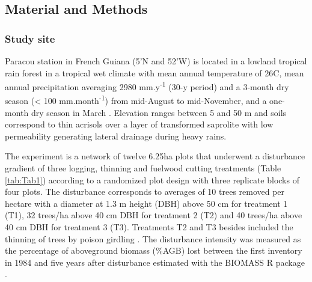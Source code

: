 \documentclass[
  11pt,
  french,
  A4paper,
  extrafontsizes,onecolumn,openright
  ]{memoir}
\begin{document}
\subsection{Material and Methods}\label{material-and-methods}

\subsubsection{Study site}\label{study-site}

Paracou station in French Guiana (5'N and
52'W) is located in a lowland tropical rain forest in a
tropical wet climate with mean annual temperature of 26\textdegree C,
mean annual precipitation averaging 2980 mm.y\textsuperscript{-1} (30-y
period) and a 3-month dry season (\textless{} 100
mm.month\textsuperscript{-1}) from mid-August to mid-November, and a
one-month dry season in March \autocite{Wagner2011}. Elevation ranges
between 5 and 50 m and soils correspond to thin acrisols over a layer of
transformed saprolite with low permeability generating lateral drainage
during heavy rains.

The experiment is a network of twelve 6.25ha plots that underwent a
disturbance gradient of three logging, thinning and fuelwood cutting
treatments (Table \ref{tab:Tab1}) according to a randomized plot design
with three replicate blocks of four plots. The disturbance corresponds
to averages of 10 trees removed per hectare with a diameter at 1.3 m
height (DBH) above 50 cm for treatment 1 (T1), 32 trees/ha above 40 cm
DBH for treatment 2 (T2) and 40 trees/ha above 40 cm DBH for treatment 3
(T3). Treatments T2 and T3 besides included the thinning of trees by
poison girdling \autocite{Schmitt1990}. The disturbance intensity was
measured as the percentage of aboveground biomass (\%AGB) lost between
the first inventory in 1984 and five years after disturbance
\autocite{Piponiot2016} estimated with the BIOMASS R package
\autocite{Biomass2018}.

\begingroup\fontsize{7}{9}\selectfont
\end{document}
